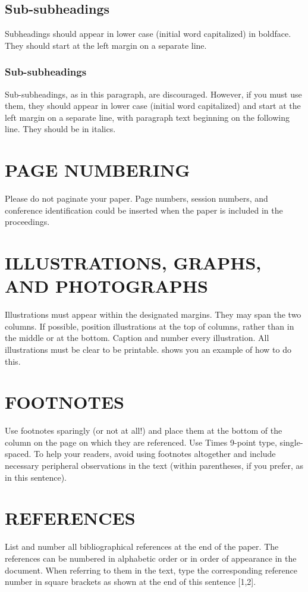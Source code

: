 \documentclass[10pt,twocolumn]{article}
\begin{document}
\subsection{Sub-subheadings}
Subheadings should appear in lower case (initial word capitalized) in boldface. They should start at the left margin on a separate line.

\subsubsection{Sub-subheadings}
Sub-subheadings, as in this paragraph, are discouraged. However, if you must use them, they should appear in lower case (initial word capitalized) and start at the left margin on a separate line, with paragraph text beginning on the following line. They should be in italics.



\section{PAGE NUMBERING}
Please do not paginate your paper. Page numbers, session numbers, and conference identification could be inserted when the paper is included in the proceedings.

\section{ILLUSTRATIONS, GRAPHS, AND PHOTOGRAPHS}
Illustrations must appear within the designated margins. They may span the two columns. If possible, position illustrations at the top of columns, rather than in the middle or at the bottom. Caption and number every illustration. All illustrations must be clear to be printable.   shows you an example of how to do this.

\section{FOOTNOTES}
Use footnotes sparingly (or not at all!) and place them at the bottom of the column on the page on which they are referenced. Use Times 9-point type, single-spaced. To help your readers, avoid using footnotes altogether and include necessary peripheral observations in the text (within parentheses, if you prefer, as in this sentence).

\section{REFERENCES}
List and number all bibliographical references at the end of the paper. The references can be numbered in alphabetic order or in order of appearance in the document. When referring to them in the text, type the corresponding reference number in square brackets as shown at the end of this sentence [1,2].
\end{document}
